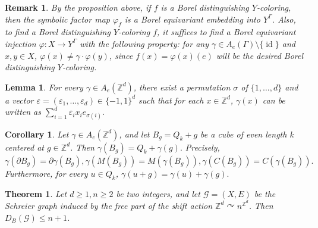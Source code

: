 \documentclass[10pt,a4paper]{amsart}
\newtheorem{theorem}{Theorem}
\newtheorem{remark}{Remark}
\newtheorem{lemma}{Lemma}
\newtheorem{corollary}{Corollary}
\newcommand{\id}{\operatorname{id}}
\begin{document}
\begin{remark}\label{11}
By the proposition above, if $f$ is a Borel distinguishing $Y$-coloring, then the symbolic factor map $\varphi_f$ is a Borel equivariant embedding into $Y^\Gamma$. Also, to find a Borel distinguishing $Y$-coloring $f$, it suffices to find a Borel equivariant injection $\varphi: X \longrightarrow Y^\Gamma$ with the following property: for any $\gamma \in A_e(\Gamma) \setminus \{\id\}$ and $x,y\in X$, $\varphi(x) \ne \gamma\cdot\varphi(y)$, since $f(x)=\varphi(x)(e)$ will be the desired Borel distinguishing $Y$-coloring. 
\end{remark}

\begin{lemma}\label{Ae}
For every 
$\gamma\in A_e(\mathbb{Z}^d)$, there exist a permutation $\sigma$ of $\{1,\dots,d\}$ and a vector $\varepsilon=(\varepsilon_1,\ldots,\varepsilon_d)\in\{-1,1\}^d$ such that for each $x\in \mathbb{Z}^d$, $\gamma(x) $ can be written as $\sum_{i=1}^d \varepsilon_i x_i e_{\sigma(i)}.$
\end{lemma} 

\begin{corollary}\label{cube}
Let $\gamma\in A_e(\mathbb{Z}^d)$, and let
$B_g=Q_k+g$ be a cube of even length $k$ centered at
$g\in\mathbb{Z}^d$. Then $\gamma(B_g)=Q_k+\gamma(g).$ Precisely, $\gamma(\partial B_g)=\partial\gamma(B_g),
\gamma(M(B_g))=M(\gamma(B_g)),\gamma(C(B_g))=C(\gamma(B_g)).$
Furthermore, for every $u\in Q_k$,
$\gamma(u+g)=\gamma(u)+\gamma(g).$
\end{corollary}

\begin{theorem}\label{upperbound}
Let $d\ge 1, n\ge 2$ be two integers, and let $\mathcal{G}=(X,E)$ be the Schreier graph induced by the free part of the shift action $\mathbb{Z}^d \curvearrowright n^{\mathbb{Z}^d}$. Then $D_{B}(\mathcal{G})\le n+1$.
\end{theorem}
\end{document}
